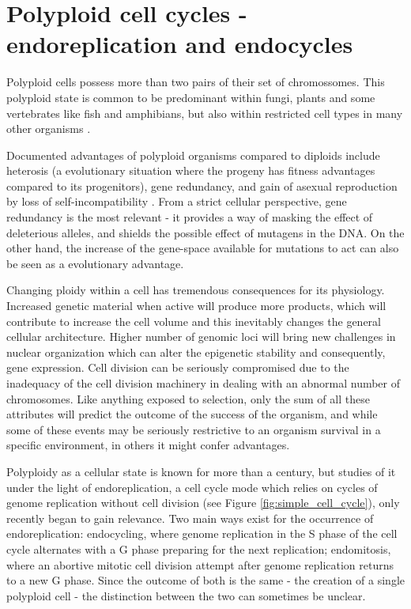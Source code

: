 \documentclass[11pt,twoside,a4paper]{report}
\begin{document}
	\section{Polyploid cell cycles - endoreplication and endocycles}
		Polyploid cells possess more than two pairs of their set of chromossomes. This polyploid state is common to be predominant within fungi, plants and some vertebrates like fish and amphibians, but also within restricted cell types in many other organisms \cite{Fox2013}.
		
		Documented advantages of polyploid organisms compared to diploids include heterosis (a evolutionary situation where the progeny has fitness advantages compared to its progenitors), gene redundancy, and gain of asexual reproduction by loss of self-incompatibility \cite{Comai2005}. From a strict cellular perspective, gene redundancy is the most relevant - it provides a way of masking the effect of deleterious alleles, and shields the possible effect of mutagens in the DNA. On the other hand, the increase of the gene-space available for mutations to act can also be seen as a evolutionary advantage.
		
		Changing ploidy within a cell has tremendous consequences for its physiology. Increased genetic material when active will produce more products, which will contribute to increase the cell volume and this inevitably changes the general cellular architecture. Higher number of genomic loci will bring new challenges in nuclear organization which can alter the epigenetic stability and consequently, gene expression. Cell division can be seriously compromised due to the inadequacy of the cell division machinery in dealing with an abnormal number of chromosomes. Like anything exposed to selection, only the sum of all these attributes will predict the outcome of the success of the organism, and while some of these events may be seriously restrictive to an organism survival in a specific environment, in others it might confer advantages.
		
		Polyploidy as a cellular state is known for more than a century, but studies of it under the light of endoreplication, a cell cycle mode which relies on cycles of genome replication without cell division (see Figure \ref{fig:simple_cell_cycle}), only recently began to gain relevance. Two main ways exist for the occurrence of endoreplication: endocycling, where genome replication in the S phase of the cell cycle alternates with a G phase preparing for the next replication; endomitosis, where an abortive mitotic cell division attempt after genome replication returns to a new G phase. Since the outcome of both is the same - the creation of a single polyploid cell - the distinction between the two can sometimes be unclear.
		
\end{document}
